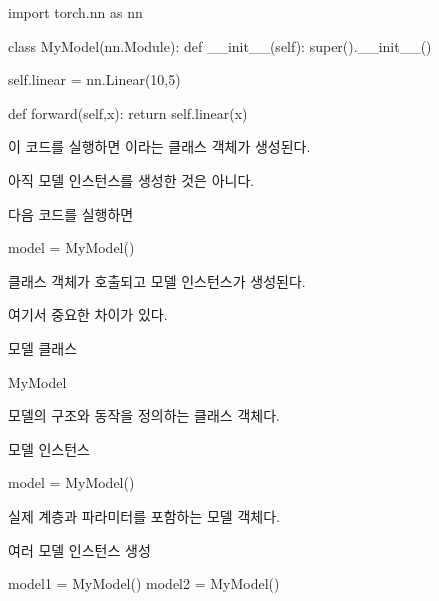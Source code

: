 \begin{dhkcode}
import torch.nn as nn

class MyModel(nn.Module):
    def __init__(self):
        super().__init__()

        self.linear = nn.Linear(10,5)

    def forward(self,x):
        return self.linear(x)
\end{dhkcode}

이 코드를 실행하면 이라는 클래스 객체가 생성된다.

아직 모델 인스턴스를 생성한 것은 아니다.

다음 코드를 실행하면

\begin{dhkcode}
model = MyModel()
\end{dhkcode}

 클래스 객체가 호출되고 모델 인스턴스가 생성된다.

여기서 중요한 차이가 있다.

\begin{dhknote}
\begin{dhksmry}[centered]
모델 클래스
\end{dhksmry}
\end{dhknote}

\begin{dhkcode}
MyModel
\end{dhkcode}

모델의 구조와 동작을 정의하는 클래스 객체다.

\begin{dhknote}
\begin{dhksmry}[centered]
모델 인스턴스
\end{dhksmry}
\end{dhknote}

\begin{dhkcode}
model = MyModel()
\end{dhkcode}

실제  계층과 파라미터를 포함하는 모델 객체다.

\begin{dhknote}
\begin{dhksmry}[centered]
여러 모델 인스턴스 생성
\end{dhksmry}
\end{dhknote}

\begin{dhkcode}
model1 = MyModel()
model2 = MyModel()
\end{dhkcode}

